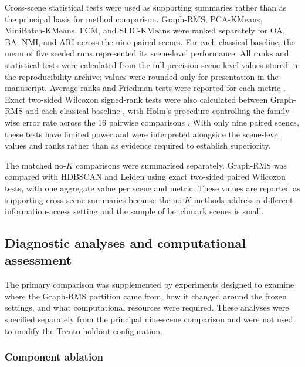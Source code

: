 \documentclass[10pt,a4paper,fleqn]{article}
\begin{document}
Cross-scene statistical tests were used as supporting summaries rather than as
the principal basis for method comparison. Graph-RMS, PCA-KMeans,
MiniBatch-KMeans, FCM, and SLIC-KMeans were ranked separately for OA, BA,
NMI, and ARI across the nine paired scenes. For each classical baseline, the
mean of five seeded runs represented its scene-level performance. All ranks
and statistical tests were calculated from the full-precision scene-level
values stored in the reproducibility archive; values were rounded only for
presentation in the manuscript. Average ranks and Friedman tests were reported
for each metric \citep{friedman1937}. Exact two-sided Wilcoxon signed-rank tests were also
calculated between Graph-RMS and each classical baseline
\citep{wilcoxon1945}, with Holm's procedure controlling the family-wise error
rate across the 16 pairwise comparisons \citep{holm1979}. With only nine
paired scenes, these tests have limited power and were interpreted alongside
the scene-level values and ranks rather than as evidence required to establish
superiority.

The matched no-\(K\) comparisons were summarised separately. Graph-RMS was
compared with HDBSCAN and Leiden using exact two-sided paired Wilcoxon tests,
with one aggregate value per scene and metric. These values are reported as
supporting cross-scene summaries because the no-\(K\) methods address a
different information-access setting and the sample of benchmark scenes is
small.

\subsection{Diagnostic analyses and computational assessment}
\label{subsec:additional_analysis}

The primary comparison was supplemented by experiments designed to examine
where the Graph-RMS partition came from, how it changed around the frozen
settings, and what computational resources were required. These analyses were
specified separately from the principal nine-scene comparison and were not
used to modify the Trento holdout configuration.

\subsubsection{Component ablation}
\end{document}
